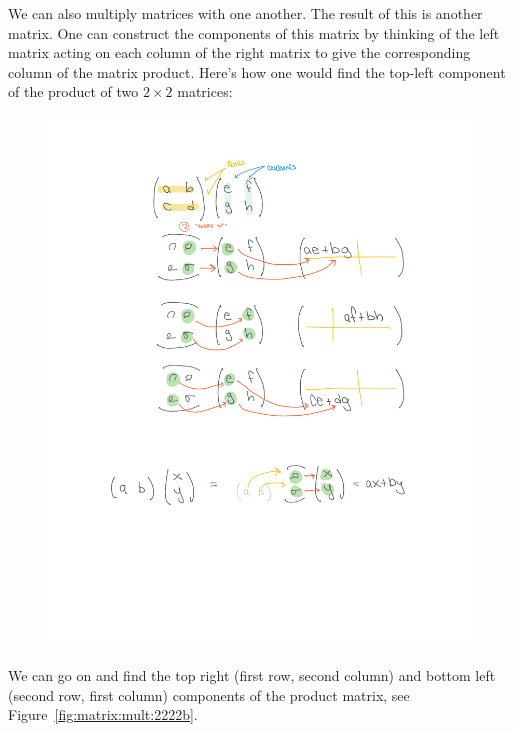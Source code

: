 \documentclass[12pt, oneside]{report}    %
\begin{document}
We can also multiply matrices with one another. The result of this is another matrix. One can construct the components of this matrix by thinking of the left matrix acting on each column of the right matrix to give the corresponding column of the matrix product. Here's how one would find the top-left component of the product of two $2\times 2$ matrices:
\begin{figure}[ht]
    \centering
    \includegraphics[width=.8\textwidth]{figures/MatrixMult_2222a.pdf}
\end{figure}
We can go on and find the top right (first row, second column) and bottom left (second row, first column) components of the product matrix, see Figure~\ref{fig:matrix:mult:2222b}.
\end{document}
